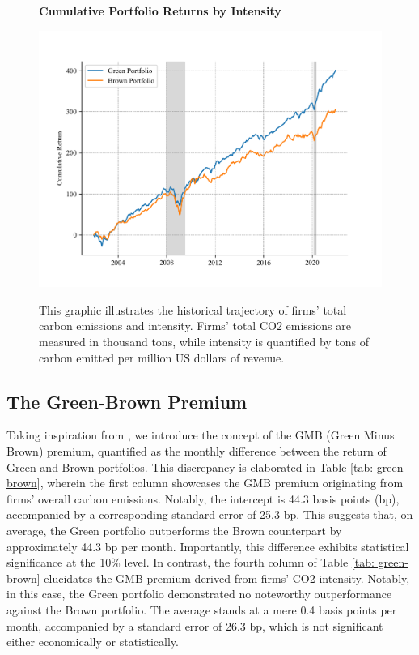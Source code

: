 \documentclass[12pt]{article}
\begin{document}
\begin{figure}[!ht]
\centering
\caption{\textbf{Cumulative Portfolio Returns by Intensity}}
\includegraphics{graphics/green_brown_int.png}
\label{fig: cum_ret_2}
\caption*{\footnotesize{This graphic illustrates the historical trajectory of firms' total carbon emissions and intensity. Firms' total CO2 emissions are measured in thousand tons, while intensity is quantified by tons of carbon emitted per million US dollars of revenue.}}
\end{figure}

\subsection{The Green-Brown Premium}


Taking inspiration from \cite{pastor2022dissecting}, we introduce the concept of the GMB (Green Minus Brown) premium, quantified as the monthly difference between the return of Green and Brown portfolios. This discrepancy is elaborated in Table \ref{tab: green-brown}, wherein the first column showcases the GMB premium originating from firms' overall carbon emissions. Notably, the intercept is 44.3 basis points (bp), accompanied by a corresponding standard error of 25.3 bp. This suggests that, on average, the Green portfolio outperforms the Brown counterpart by approximately 44.3 bp per month. Importantly, this difference exhibits statistical significance at the 10\% level. In contrast, the fourth column of Table \ref{tab: green-brown} elucidates the GMB premium derived from firms' CO2 intensity. Notably, in this case, the Green portfolio demonstrated no noteworthy outperformance against the Brown portfolio. The average stands at a mere 0.4 basis points per month, accompanied by a standard error of 26.3 bp, which is not significant either economically or statistically.
\end{document}

